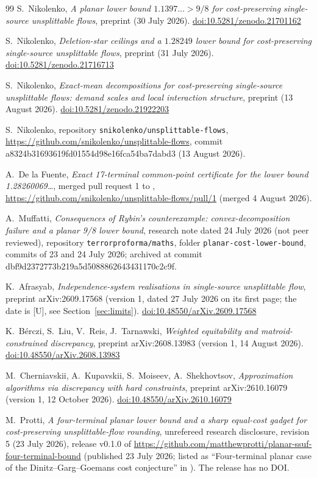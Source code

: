 \documentclass[11pt]{article}
\theoremstyle{remark}
\newcommand{\doi}[1]{\href{https://doi.org/#1}{doi:#1}}
\begin{document}
{\begin{thebibliography}{99}
 S.\ Nikolenko, \emph{A planar lower bound $1.1397\ldots>9/8$ for cost-preserving single-source unsplittable flows}, preprint (30 July 2026). \doi{10.5281/zenodo.21701162}

 S.\ Nikolenko, \emph{Deletion-star ceilings and a $1.28249$ lower bound for cost-preserving single-source unsplittable flows}, preprint (31 July 2026). \doi{10.5281/zenodo.21716713}

 S.\ Nikolenko, \emph{Exact-mean decompositions for cost-preserving single-source unsplittable flows: demand scales and local interaction structure}, preprint (13 August 2026). \doi{10.5281/zenodo.21922203}

 S.\ Nikolenko, repository \texttt{snikolenko/unsplittable-flows}, \url{https://github.com/snikolenko/unsplittable-flows}, commit a8324b31693619fd01554d98e16fca54ba7dabd3 (13 August 2026).

 A.\ De la Fuente, \emph{Exact 17-terminal common-point certificate for the lower bound 1.28260069\ldots}, merged pull request 1 to \cite{NikRepo}, \url{https://github.com/snikolenko/unsplittable-flows/pull/1} (merged 4 August 2026).

 A.\ Muffatti, \emph{Consequences of Rybin's counterexample: convex-decomposition failure and a planar 9/8 lower bound}, research note dated 24 July 2026 (not peer reviewed), repository \texttt{terrorproforma/maths}, folder \texttt{planar-cost-lower-bound}, commits of 23 and 24 July 2026; archived at commit dbf9d2372773b219a5d5088862643431170c2c9f.

 K.\ Afrasyab, \emph{Independence-system realisations in single-source unsplittable flow}, preprint arXiv:2609.17568 (version 1, dated 27 July 2026 on its first page; the date is [U], see Section~\ref{sec:limits}). \doi{10.48550/arXiv.2609.17568}

 K.\ B\'erczi, S.\ Liu, V.\ Reis, J.\ Tarnawski, \emph{Weighted equitability and matroid-constrained discrepancy}, preprint arXiv:2608.13983 (version 1, 14 August 2026). \doi{10.48550/arXiv.2608.13983}

 M.\ Cherniavskii, A.\ Kupavskii, S.\ Moiseev, A.\ Shekhovtsov, \emph{Approximation algorithms via discrepancy with hard constraints}, preprint arXiv:2610.16079 (version 1, 12 October 2026). \doi{10.48550/arXiv.2610.16079}

 M.\ Protti, \emph{A four-terminal planar lower bound and a sharp equal-cost gadget for cost-preserving unsplittable-flow rounding}, unrefereed research disclosure, revision 5 (23 July 2026), release v0.1.0 of \url{https://github.com/matthewprotti/planar-ssuf-four-terminal-bound} (published 23 July 2026; listed as ``Four-terminal planar case of the Dinitz--Garg--Goemans cost conjecture'' in \cite{Nik3}). The release has no DOI.


\end{thebibliography}}
\end{document}
